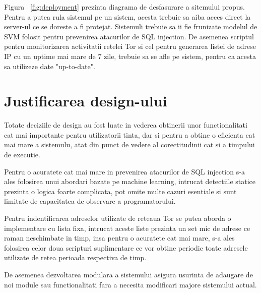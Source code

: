 Figura ~\ref{fig:deployment} prezinta diagrama de desfasurare a sitemului propus. \\
Pentru a putea rula sistemul \textit{\thesistitle} pe un sistem, acesta trebuie sa aiba acces direct la server-ul ce se doreste a fi protejat. Sistemuli trebuie sa ii fie frunizate modelul de SVM folosit pentru prevenirea atacurilor de SQL injection. De asemenea scriptul pentru monitorizarea activitatii retelei Tor si cel pentru generarea listei de adrese IP cu un uptime mai mare de 7 zile, trebuie sa se afle pe sistem, pentru ca acesta sa utilizeze date "up-to-date".

\section{Justificarea design-ului}
 

Totate deciziile de design au fost luate in vederea obtinerii unor functionalitati cat mai importante pentru utilizatorii tinta, dar si pentru a obtine o eficienta cat mai mare a sistemulu, atat din punct de vedere al corectitudinii cat si a timpului de executie.


Pentru o acuratete cat mai mare in prevenirea atacurilor de SQL injection s-a ales folosirea unui abordari bazate pe machine learning, intrucat detectiile statice prezinta o logica foarte complicata, pot omite multe cazuri esentiale si sunt limitate de capacitatea de observare a programatorului. 


Pentru indentificarea adreselor utilizate de reteaua Tor se putea aborda o implementare cu lista fixa, intrucat aceste liste prezinta un set mic de adrese ce raman neschimbate in timp, insa pentru o acuratete cat mai mare, s-a ales folosirea celor doua scripturi suplimentare ce vor obtine periodic toate adresele utilizate de retea perioada respectiva de timp.


De asemenea dezvoltarea modulara a sistemului asigura usurinta de adaugare de noi module sau functionalitati fara a necesita modificari majore sistemului actual.

